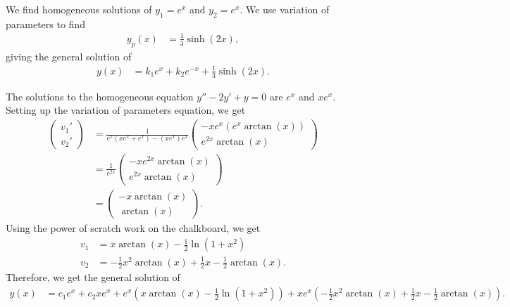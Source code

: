 \documentclass[12pt]{mypackage}
\begin{document}
\begin{solution}[4.6, Problem 8]
  We find homogeneous solutions of $y_1 = e^{x}$ and $y_2 = e^x$. We use variation of parameters to find
  \begin{align*}
    y_p(x) &= \frac{1}{3}\sinh(2x),
  \end{align*}
  giving the general solution of
  \begin{align*}
    y(x) &= k_1e^x + k_2e^{-x} + \frac{1}{3}\sinh(2x).
  \end{align*}
\end{solution}
\begin{solution}[4.6, Problem 14]
  The solutions to the homogeneous equation $y'' - 2y' + y = 0$ are $e^x$ and $xe^x$. Setting up the variation of parameters equation, we get
  \begin{align*}
    \begin{pmatrix}v_1'\\v_2'\end{pmatrix} &= \frac{1}{e^x\left( xe^x + e^x \right) - \left( xe^x \right)e^x}\begin{pmatrix}-xe^x\left( e^{x}\arctan(x) \right) \\ e^{2x}\arctan(x)\end{pmatrix}\\
                                           &= \frac{1}{e^{2x}} \begin{pmatrix}-xe^{2x}\arctan(x) \\ e^{2x}\arctan(x)\end{pmatrix}\\
                                           &= \begin{pmatrix}-x\arctan(x) \\ \arctan(x)\end{pmatrix}.
  \end{align*}
  Using the power of scratch work on the chalkboard, we get
  \begin{align*}
    v_1 &= x\arctan(x) - \frac{1}{2}\ln\left( 1 + x^2 \right)\\
    v_2 &= -\frac{1}{2}x^2\arctan(x) + \frac{1}{2}x - \frac{1}{2}\arctan(x).
  \end{align*}
  Therefore, we get the general solution of
  \begin{align*}
    y(x) &= c_1e^x + c_2xe^x + e^x\left( x\arctan(x) - \frac{1}{2}\ln\left( 1 + x^2 \right) \right) + xe^x\left( -\frac{1}{2}x^2\arctan(x) + \frac{1}{2}x - \frac{1}{2}\arctan(x) \right).
  \end{align*}
\end{solution}
\end{document}
